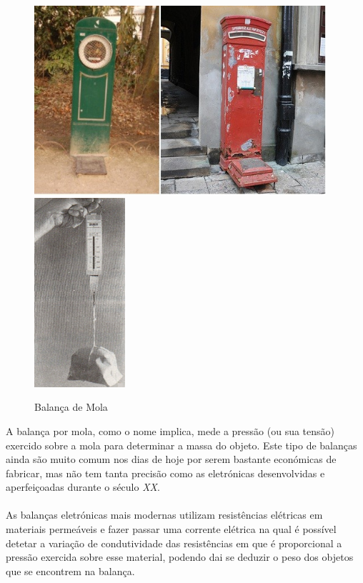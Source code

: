 \begin{minipage}[!b]{\linewidth}
	\begin{figure}[H]
		\captionsetup{justification=raggedright,singlelinecheck=false}
		\flushleft
		\includegraphics[height=7cm]{./image/PESTA/general/Public_Body_Scales_1.jpg}
		\hspace{.8cm}
		\includegraphics[height=7cm]{./image/PESTA/general/Balanca_Mola_1.jpg}
		\caption{Balança de Mola}
		\label{Balanca_Mola_1}
	\end{figure}
\end{minipage}
\newline
\newline
\newline
A balança por mola, como o nome implica, mede a pressão (ou sua tensão) exercido sobre a mola para determinar a massa do objeto. Este tipo de balanças ainda são muito comum nos dias de hoje por serem bastante económicas de fabricar, mas não tem tanta precisão como as eletrónicas desenvolvidas e aperfeiçoadas durante o século \textit{XX}.
\\
\\
As balanças eletrónicas mais modernas utilizam resistências elétricas em materiais permeáveis e fazer passar uma corrente elétrica na qual é possível detetar a variação de condutividade das resistências em que é proporcional a pressão exercida sobre esse material, podendo dai se deduzir o peso dos objetos que se encontrem na balança. \\
